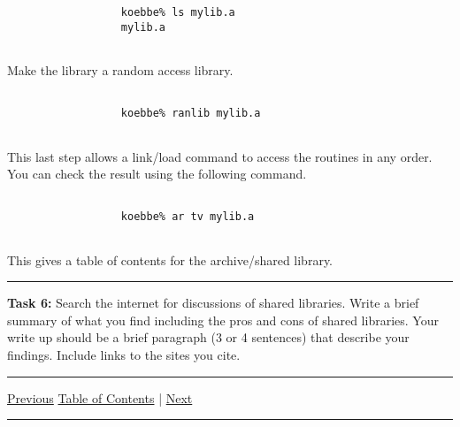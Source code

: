 \documentclass[10pt,fleqn]{article}
\begin{document}
\begin{trivlist}
\begin{trivlist}
\begin{verbatim}
                  koebbe% ls mylib.a
                  mylib.a
                
                \end{verbatim}
          \item Make the library a random access library.
                \begin{verbatim}

                  koebbe% ranlib mylib.a
                
                \end{verbatim}
                This last step allows a link/load command to access the routines
                in any order. You can check the result using the following
                command.
                \begin{verbatim}

                  koebbe% ar tv mylib.a
                
                \end{verbatim}
                This gives a table of contents for the archive/shared library.
        \end{trivlist}
\vskip0.1in\hrule\vskip0.1in \noindent
  \item[\bf Task 6:] Search the internet for discussions of shared libraries.
        Write a brief summary of what you find including the pros and cons of
        shared libraries. Your write up should be a brief paragraph (3 or 4
        sentences) that describe your findings. Include links to the sites you
        cite.
\end{trivlist}
\vskip0.1in\hrule\vskip0.1in \noindent
  \href{../../tasksheet_02/html/tasksheet_02.html}{Previous}
  \href{../../toc/md/tasksheet_toc.md}{Table of Contents} |
  \href{../../tasksheet_04/html/tasksheet_04.html}{Next}
\vskip0.1in\hrule\vskip0.1in \noindent
\end{document}

